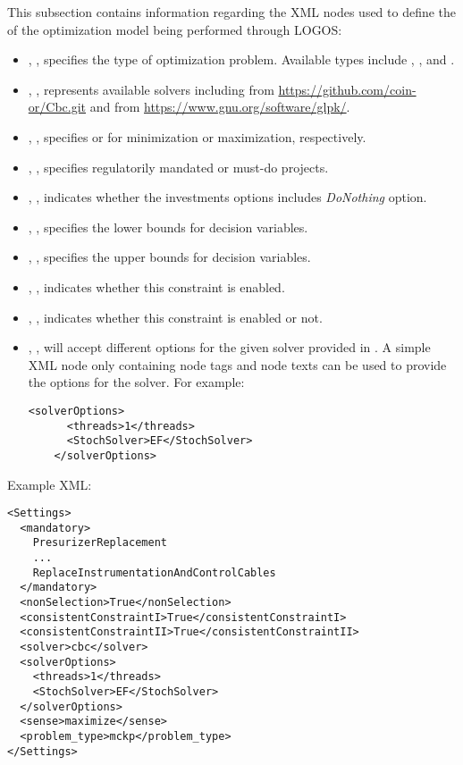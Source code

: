 This subsection contains information regarding the XML nodes used to define the
 of the optimization model being performed through LOGOS:
\begin{itemize}
  \item {}, , specifies the type of
  optimization problem. Available types include ,
  , and .
  \item {}, , represents available solvers including
   from \url{https://github.com/coin-or/Cbc.git} and  from
  \url{https://www.gnu.org/software/glpk/}.
  \item {}, , specifies 
  or  for minimization or maximization, respectively.
  \item {}, ,
  specifies regulatorily mandated or must-do projects.
  \item {}, , indicates whether the
  investments options includes \textit{DoNothing} option.
  \item {}, , specifies the lower bounds
  for decision variables.
  \item {}, , specifies the upper bounds
  for decision variables.
  \item {}, , indicates whether
  this constraint is enabled.
  \item {}, , indicates whether
  this constraint is enabled or not.
  \item {}, , will accept
  different options for the given solver provided in . A simple XML node only containing
  node tags and node texts can be used to provide the options for the solver. For example:
  \begin{lstlisting}[style=XML]
    <solverOptions>
      <threads>1</threads>
      <StochSolver>EF</StochSolver>
    </solverOptions>
  \end{lstlisting}
\end{itemize}

Example XML:
\begin{lstlisting}[style=XML]
<Settings>
  <mandatory>
    PresurizerReplacement
    ...
    ReplaceInstrumentationAndControlCables
  </mandatory>
  <nonSelection>True</nonSelection>
  <consistentConstraintI>True</consistentConstraintI>
  <consistentConstraintII>True</consistentConstraintII>
  <solver>cbc</solver>
  <solverOptions>
    <threads>1</threads>
    <StochSolver>EF</StochSolver>
  </solverOptions>
  <sense>maximize</sense>
  <problem_type>mckp</problem_type>
</Settings>
\end{lstlisting}
